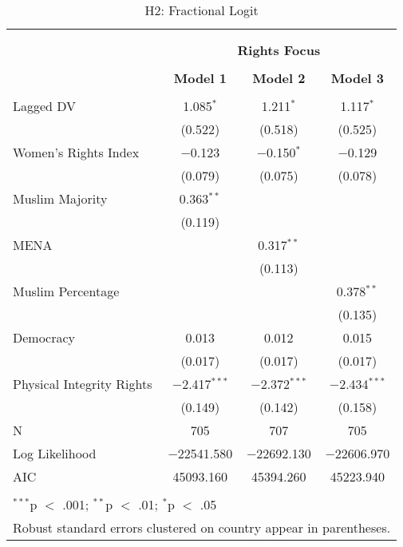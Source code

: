 
\begin{table}[!htbp] \centering 
  \caption{H2: Fractional Logit} 
  \label{} 
\begin{tabular}{@{\extracolsep{5pt}}lccc} 
\\[-1.8ex]\hline \\[-1.8ex] 
\\[-1.8ex] & \multicolumn{3}{c}{\textbf{Rights Focus}} \\ 
\\[-1.8ex] & \textbf{Model 1} & \textbf{Model 2} & \textbf{Model 3}\\ 
\hline \\[-1.8ex] 
 Lagged DV & 1.085$^{*}$ & 1.211$^{*}$ & 1.117$^{*}$ \\ 
  & (0.522) & (0.518) & (0.525) \\ 
  Women's Rights Index & $-$0.123 & $-$0.150$^{*}$ & $-$0.129 \\ 
  & (0.079) & (0.075) & (0.078) \\ 
  Muslim Majority & 0.363$^{**}$ &  &  \\ 
  & (0.119) &  &  \\ 
  MENA &  & 0.317$^{**}$ &  \\ 
  &  & (0.113) &  \\ 
  Muslim Percentage &  &  & 0.378$^{**}$ \\ 
  &  &  & (0.135) \\ 
  Democracy & 0.013 & 0.012 & 0.015 \\ 
  & (0.017) & (0.017) & (0.017) \\ 
  Physical Integrity Rights & $-$2.417$^{***}$ & $-$2.372$^{***}$ & $-$2.434$^{***}$ \\ 
  & (0.149) & (0.142) & (0.158) \\ 
 N & 705 & 707 & 705 \\ 
Log Likelihood & $-$22541.580 & $-$22692.130 & $-$22606.970 \\ 
AIC & 45093.160 & 45394.260 & 45223.940 \\ 
\hline \\[-1.8ex] 
\multicolumn{4}{l}{$^{***}$p $<$ .001; $^{**}$p $<$ .01; $^{*}$p $<$ .05} \\ 
\multicolumn{4}{l}{Robust standard errors clustered on country appear in parentheses.} \\ 
\end{tabular} 
\end{table} 
